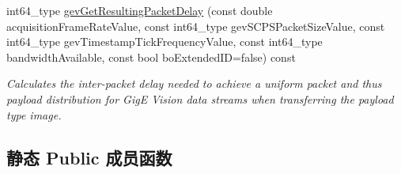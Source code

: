 \begin{DoxyCompactItemize}
int64\+\_\+type \hyperlink{classmv_i_m_p_a_c_t_1_1acquire_1_1_gen_i_cam_1_1_transport_layer_control_a3b455e6d36fed4d6753f10040d389147}{gev\+Get\+Resulting\+Packet\+Delay} (const double acquisition\+Frame\+Rate\+Value, const int64\+\_\+type gev\+S\+C\+P\+S\+Packet\+Size\+Value, const int64\+\_\+type gev\+Timestamp\+Tick\+Frequency\+Value, const int64\+\_\+type bandwidth\+Available, const bool bo\+Extended\+I\+D=false) const 
\begin{DoxyCompactList}\small\item\em Calculates the inter-\/packet delay needed to achieve a uniform packet and thus payload distribution for Gig\+E Vision data streams when transferring the payload type {\itshape image}. \end{DoxyCompactList}\end{DoxyCompactItemize}
\subsection*{静态 Public 成员函数}

